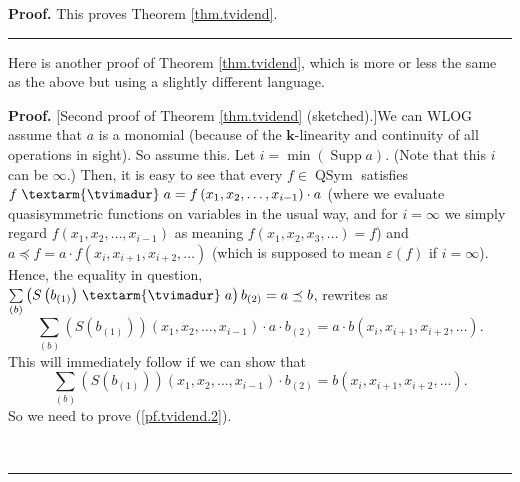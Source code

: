 \documentclass
[numbers=enddot,12pt,final,onecolumn,notitlepage,abstracton]{scrartcl}%
\theoremstyle{definition}
\newenvironment{proof}[1][Proof]{\noindent\textbf{#1.} }{\ \rule{0.5em}{0.5em}}
\newenvironment{verlong}{}{}
\newenvironment{noncompile}{}{}
\newcommand{\tvi}{\left. \textarm{\tvimadur} \right.}
\let\sumnonlimits\sum
\renewcommand{\sum}{\sumnonlimits\limits}
\begin{document}
\begin{verlong}
\begin{proof}
This proves Theorem \ref{thm.tvidend}.
\end{proof}

\begin{noncompile}
Here is another proof of Theorem \ref{thm.tvidend}, which is more or less the
same as the above but using a slightly different language.

\begin{proof}
[Second proof of Theorem \ref{thm.tvidend} (sketched).]We can WLOG assume that
$a$ is a monomial (because of the $\mathbf{k}$-linearity and continuity of all
operations in sight). So assume this. Let $i=\min\left(  \operatorname*{Supp}%
a\right)  $. (Note that this $i$ can be $\infty$.) Then, it is easy to see
that every $f\in\operatorname*{QSym}$ satisfies $f\tvi a=f\left(  x_{1}%
,x_{2},\ldots,x_{i-1}\right)  \cdot a$ (where we evaluate quasisymmetric
functions on variables in the usual way, and for $i=\infty$ we simply regard
$f\left(  x_{1},x_{2},\ldots,x_{i-1}\right)  $ as meaning $f\left(
x_{1},x_{2},x_{3},\ldots\right)  =f$) and $a\left.  \preceq\right.  f=a\cdot
f\left(  x_{i},x_{i+1},x_{i+2},\ldots\right)  $ (which is supposed to mean
$\varepsilon\left(  f\right)  $ if $i=\infty$). Hence, the equality in
question, $\sum_{\left(  b\right)  }\left(  S\left(  b_{\left(  1\right)
}\right)  \tvi a\right)  b_{\left(  2\right)  }=a\left.  \preceq\right.  b$,
rewrites as%
\[
\sum_{\left(  b\right)  }\left(  S\left(  b_{\left(  1\right)  }\right)
\right)  \left(  x_{1},x_{2},\ldots,x_{i-1}\right)  \cdot a\cdot b_{\left(
2\right)  }=a\cdot b\left(  x_{i},x_{i+1},x_{i+2},\ldots\right)  .
\]
This will immediately follow if we can show that%
\begin{equation}
\sum_{\left(  b\right)  }\left(  S\left(  b_{\left(  1\right)  }\right)
\right)  \left(  x_{1},x_{2},\ldots,x_{i-1}\right)  \cdot b_{\left(  2\right)
}=b\left(  x_{i},x_{i+1},x_{i+2},\ldots\right)  . \label{pf.tvidend.2}%
\end{equation}
So we need to prove (\ref{pf.tvidend.2}).


\end{proof}
\end{noncompile}
\end{verlong}
\end{document}
